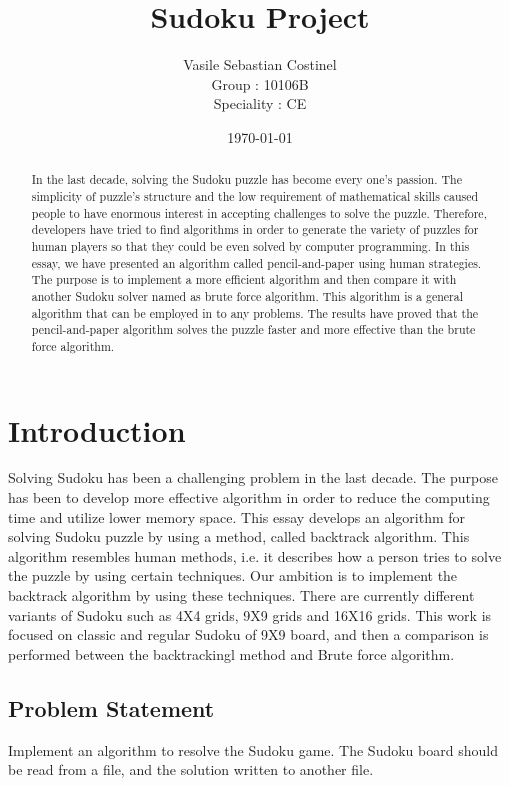 \documentclass[12pt, letterpaper, twoside]{article}
\title{Sudoku Project}
\author{Vasile Sebastian Costinel \\ Group : 10106B \\ Speciality : CE}
\date{\today}
\begin{document}
\begin{titlepage}
\maketitle

\begin{abstract}
In the last decade, solving the Sudoku puzzle has become every one’s
passion. The simplicity of puzzle’s structure and the low requirement
of mathematical skills caused people to have enormous interest in
accepting challenges to solve the puzzle. Therefore, developers have
tried to find algorithms in order to generate the variety of puzzles for
human players so that they could be even solved by computer
programming. In this essay, we have presented an algorithm called
pencil-and-paper using human strategies. The purpose is to implement
a more efficient algorithm and then compare it with another Sudoku
solver named as brute force algorithm. This algorithm is a general
algorithm that can be employed in to any problems. The results have
proved that the pencil-and-paper algorithm solves the puzzle faster
and more effective than the brute force algorithm.
\end{abstract}

\end{titlepage}



    \section{Introduction}
    Solving Sudoku has been a challenging problem in the last decade. The purpose has been to
    develop more effective algorithm in order to reduce the computing time and utilize lower
    memory space. This essay develops an algorithm for solving Sudoku puzzle by using a
    method, called backtrack algorithm. This algorithm resembles human methods, i.e. it
    describes how a person tries to solve the puzzle by using certain techniques. Our ambition is
    to implement the backtrack algorithm by using these techniques.
    There are currently different variants of Sudoku such as 4X4 grids, 9X9 grids and 16X16
    grids. This work is focused on classic and regular Sudoku of 9X9 board, and then a
    comparison is performed between the backtrackingl method and Brute force algorithm.
        \subsection{Problem Statement}
        Implement an algorithm to resolve the Sudoku game. The Sudoku board should be read from a file, and the solution written to another file. \\
\end{document}
